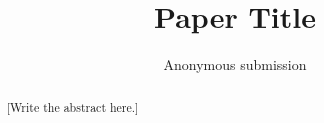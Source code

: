 \documentclass[letterpaper,twocolumn,10pt]{article}
\begin{document}

\date{}

\title{\Large \bf Paper Title}

\author{
{\rm Anonymous submission}
}

\maketitle

\begin{abstract}

[Write the abstract here.]

\end{abstract}














\end{document}
